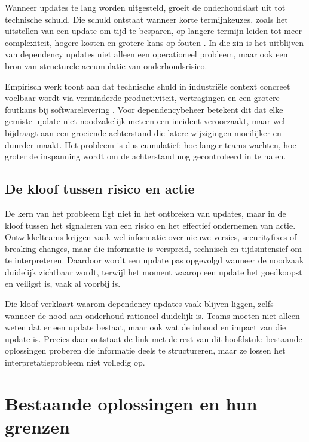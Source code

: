 Wanneer updates te lang worden uitgesteld, groeit de onderhoudslast uit tot technische schuld. Die schuld ontstaat wanneer korte termijnkeuzes, zoals het uitstellen van een update om tijd te besparen, op langere termijn leiden tot meer complexiteit, hogere kosten en grotere kans op fouten \textcite{Behutiye2024,Ruiz2024}. In die zin is het uitblijven van dependency updates niet alleen een operationeel probleem, maar ook een bron van structurele accumulatie van onderhoudsrisico.

Empirisch werk toont aan dat technische shuld in industriële context concreet voelbaar wordt via verminderde productiviteit, vertragingen en een grotere foutkans bij softwarelevering \textcite{Chalmers2020}. Voor dependencybeheer betekent dit dat elke gemiste update niet noodzakelijk meteen een incident veroorzaakt, maar wel bijdraagt aan een groeiende achterstand die latere wijzigingen moeilijker en duurder maakt. Het probleem is dus cumulatief: hoe langer teams wachten, hoe groter de inspanning wordt om de achterstand nog gecontroleerd in te halen.

\subsection{De kloof tussen risico en actie}

De kern van het probleem ligt niet in het ontbreken van updates, maar in de kloof tussen het signaleren van een risico en het effectief ondernemen van actie. Ontwikkelteams krijgen vaak wel informatie over nieuwe versies, securityfixes of breaking changes, maar die informatie is verspreid, technisch en tijdsintensief om te interpreteren. Daardoor wordt een update pas opgevolgd wanneer de noodzaak duidelijk zichtbaar wordt, terwijl het moment waarop een update het goedkoopst en veiligst is, vaak al voorbij is.

Die kloof verklaart waarom dependency updates vaak blijven liggen, zelfs wanneer de nood aan onderhoud rationeel duidelijk is. Teams moeten niet alleen weten dat er een update bestaat, maar ook wat de inhoud en impact van die update is. Precies daar ontstaat de link met de rest van dit hoofdstuk: bestaande oplossingen proberen die informatie deels te structureren, maar ze lossen het interpretatieprobleem niet volledig op.

\section{Bestaande oplossingen en hun grenzen}
\label{sec:bestaande-oplossingen}

